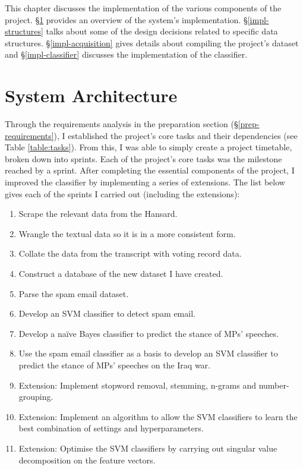 \documentclass[12pt,a4paper,twoside,openright]{report}
\begin{document}
This chapter discusses the implementation of the various components of the project. \S\ref{impl-architecture} provides an overview of the system's implementation. \S\ref{impl-structures} talks about some of the design decisions related to specific data structures. \S\ref{impl-acquisition} gives details about compiling the project's dataset and \S\ref{impl-classifier} discusses the implementation of the classifier.


\section{System Architecture} \label{impl-architecture}

Through the requirements analysis in the preparation section (\S\ref{prep-requirements}), I established the project's core tasks and their dependencies (see Table \ref{table:tasks}). From this, I was able to simply create a project timetable, broken down into sprints. Each of the project's core tasks was the milestone reached by a sprint. After completing the essential components of the project, I improved the classifier by implementing a series of extensions. The list below gives each of the sprints I carried out (including the extensions):
\begin{enumerate}
	\item Scrape the relevant data from the Hansard.
	\item Wrangle the textual data so it is in a more consistent form.
	\item Collate the data from the transcript with voting record data.
	\item Construct a database of the new dataset I have created.
	\item Parse the spam email dataset.
	\item Develop an SVM classifier to detect spam email.
	\item Develop a na\"{i}ve Bayes classifier to predict the stance of MPs' speeches.
	\item Use the spam email classifier as a basis to develop an SVM classifier to predict the stance of MPs' speeches on the Iraq war.
	\item Extension: Implement stopword removal, stemming, n-grams and number-grouping.
	\item Extension: Implement an algorithm to allow the SVM classifiers to learn the best combination of settings and hyperparameters.
	\item Extension: Optimise the SVM classifiers by carrying out singular value decomposition on the feature vectors.
\end{enumerate}
\end{document}

